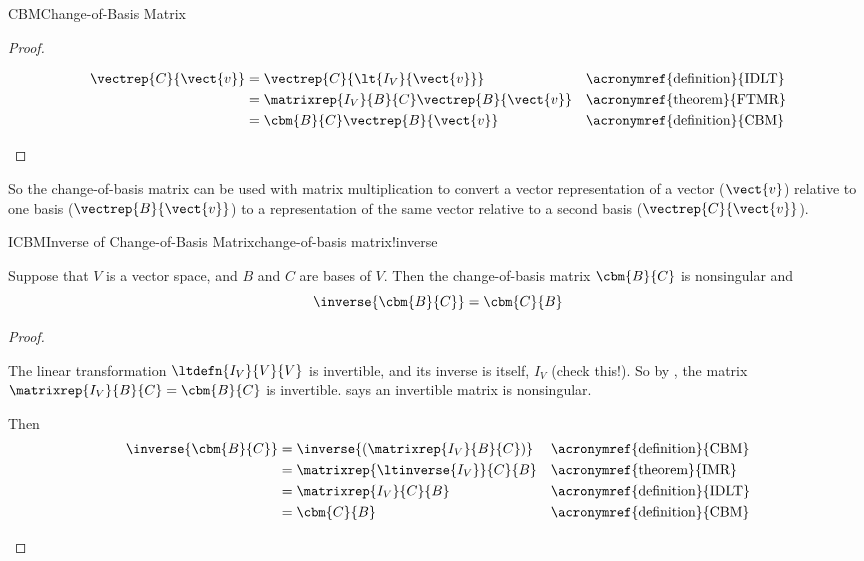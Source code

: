 \begin{subsect}{CBM}{Change-of-Basis Matrix}
\begin{proof}
%
\begin{para}
\begin{align*}
\vectrep{C}{\vect{v}}
&=\vectrep{C}{\lt{I_V}{\vect{v}}}
&&\text{\acronymref{definition}{IDLT}}\\
%
&=\matrixrep{I_V}{B}{C}\vectrep{B}{\vect{v}}
&&\text{\acronymref{theorem}{FTMR}}\\
%
&=\cbm{B}{C}\vectrep{B}{\vect{v}}
&&\text{\acronymref{definition}{CBM}}
%
\end{align*}
\end{para}
%
\end{proof}
%
\begin{para}So the change-of-basis matrix can be used with matrix multiplication to convert a vector representation of a vector ($\vect{v}$) relative to one basis ($\vectrep{B}{\vect{v}}$) to a representation of the same vector relative to a second basis ($\vectrep{C}{\vect{v}}$).\end{para}
%
%
\begin{theorem}{ICBM}{Inverse of Change-of-Basis Matrix}{change-of-basis matrix!inverse}
\begin{para}Suppose that $V$ is a vector space, and $B$ and $C$ are bases of $V$.
Then the change-of-basis matrix $\cbm{B}{C}$ is nonsingular and
%
\begin{equation*}
\inverse{\cbm{B}{C}}=\cbm{C}{B}
\end{equation*}
\end{para}
%
\end{theorem}
%
\begin{proof}
\begin{para}The linear transformation $\ltdefn{I_V}{V}{V}$ is invertible, and its inverse is itself, $I_V$ (check this!). So by , the matrix $\matrixrep{I_V}{B}{C}=\cbm{B}{C}$ is invertible.   says an invertible matrix is nonsingular.\end{para}
%
\begin{para}Then
%
\begin{align*}
\inverse{\cbm{B}{C}}
&=\inverse{\left(\matrixrep{I_V}{B}{C}\right)}&&\text{\acronymref{definition}{CBM}}\\
&=\matrixrep{\ltinverse{I_V}}{C}{B}&&\text{\acronymref{theorem}{IMR}}\\
&=\matrixrep{I_V}{C}{B}&&\text{\acronymref{definition}{IDLT}}\\
&=\cbm{C}{B}&&\text{\acronymref{definition}{CBM}}\\
\end{align*}

\end{para}
\end{proof}
\end{subsect}
